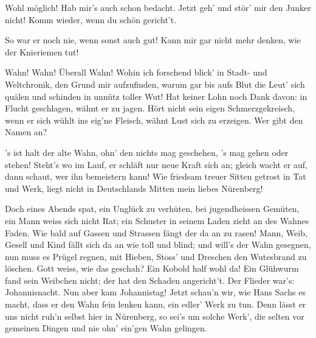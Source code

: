 \begin{drama}
\Sachsspeaks
Wohl möglich! Hab mir's auch schon bedacht.
Jetzt geh' und stör' mir den Junker nicht!
Komm wieder, wenn du schön gericht't.

\Davidspeaks


So war er noch nie, wenn sonst auch gut!
Kann mir gar nicht mehr denken, wie der Knieriemen tut!



\Sachsspeaks


Wahn! Wahn! Überall Wahn!
Wohin ich forschend blick'
in Stadt- und Weltchronik,
den Grund mir aufzufinden,
warum gar bis aufs Blut
die Leut' sich quälen und schinden
in unnütz toller Wut!
Hat keiner Lohn noch Dank davon:
in Flucht geschlagen, wähnt er zu jagen.
Hört nicht sein eigen Schmerzgekreisch,
wenn er sich wühlt ins eig'ne Fleisch,
wähnt Lust sich zu erzeigen.
Wer gibt den Namen an?


's ist halt der alte Wahn,
ohn' den nichts mag geschehen,
's mag gehen oder stehen!
Steht's wo im Lauf,
er schläft nur neue Kraft sich an;
gleich wacht er auf,
dann schaut, wer ihn bemeistern kann!
Wie friedsam treuer Sitten
getrost in Tat und Werk,
liegt nicht in Deutschlands Mitten
mein liebes Nürenberg!


Doch eines Abends spat,
ein Unglück zu verhüten,
bei jugendheissen Gemüten,
ein Mann weiss sich nicht Rat;
ein Schuster in seinem Laden
zieht an des Wahnes Faden.
Wie bald auf Gassen und Strassen
fängt der da an zu rasen!
Mann, Weib, Gesell und Kind
fällt sich da an wie toll und blind;
und will's der Wahn gesegnen,
nun muss es Prügel regnen,
mit Hieben, Stoss' und Dreschen
den Wutesbrand zu löschen.
Gott weiss, wie das geschah?
Ein Kobold half wohl da!
Ein Glühwurm fand sein Weibchen nicht;
der hat den Schaden angericht't.
Der Flieder war's:
Johannisnacht.
Nun aber kam Johannistag!
Jetzt schau'n wir, wie Hans Sachs es macht,
dass er den Wahn fein lenken kann,
ein edler' Werk zu tun.
Denn lässt er uns nicht ruh'n
selbst hier in Nürenberg,
so sei's um solche Werk',
die selten vor gemeinen Dingen
und nie ohn' ein'gen Wahn gelingen.



\end{drama}
